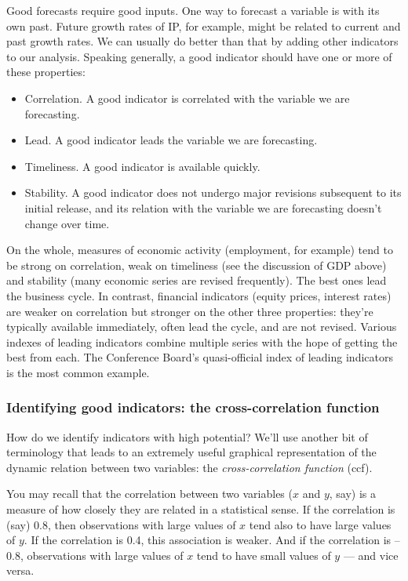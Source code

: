 \documentclass[letterpaper,12pt]{article}
\begin{document}
Good forecasts require good inputs.
One way to forecast a variable is with its own past.
Future growth rates of IP, for example, might be related
to current and past growth rates.
We can usually do better than that by adding other indicators
to our analysis.
Speaking generally,
a good indicator should have one or more of these properties:
%
\begin{itemize}

\item Correlation.  A good indicator is correlated with the
variable we are forecasting.

\item Lead. A good indicator leads the variable we are
forecasting.

\item Timeliness.  A good indicator is available quickly.

\item Stability.  A good indicator does not undergo major
revisions subsequent to its initial release, and its
relation with the variable we are forecasting doesn't
change over time.

\end{itemize}
On the whole, measures of economic activity
(employment, for example)
tend to be strong on correlation, weak on timeliness (see the
discussion of GDP above) and stability (many economic series are
revised frequently).  The best ones lead the business cycle.  In
contrast, financial indicators (equity prices, interest rates) are
weaker on correlation but stronger on the other three properties:
they're typically available immediately, often lead the cycle, and
are not revised.
Various indexes of leading indicators combine multiple series with the
hope of getting the best from each.  The Conference Board's
quasi-official index of leading indicators is the most common example.



\subsubsection*{Identifying good indicators: the cross-correlation function}

How do we identify indicators with high potential?
We'll use another bit of terminology that leads to an extremely useful
graphical representation of the dynamic relation between two variables:
the {\it cross-correlation function\/} (ccf).

You may recall that the correlation between two variables
($x$ and $y$, say) is a measure of
how closely they are related in a statistical sense.
If the correlation is (say) 0.8,
then observations with large values of $x$
tend also to have large values of $y$.
If the correlation is 0.4, this association is weaker.
And if the correlation is --0.8,
observations with large values of $x$
tend to have small values of $y$ --- and vice versa.
\end{document}

